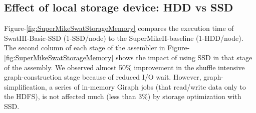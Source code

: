 \documentclass[conference]{IEEEtran}
\begin{document}
\subsection {Effect of local storage device: HDD vs SSD} \label{EffectOfSSD}
Figure-\ref{fig:SuperMikeSwatStorageMemory} compares the execution time of SwatIII-Basic-SSD (1-SSD/node) to the SuperMikeII-baseline (1-HDD/node).
The second column of each stage of the assembler in Figure-\ref{fig:SuperMikeSwatStorageMemory} shows the impact of using SSD in that stage of the assembly.
We observed almost 50\% improvement in the shuffle intensive graph-construction stage because of reduced I/O wait. 
However, graph-simplification, a series of in-memory Giraph jobs (that read/write data only to the HDFS), is not affected much (less than 3\%) by storage optimization with SSD. 
\end{document}
